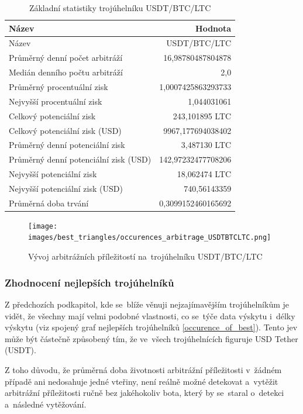 \documentclass[thesis=B,czech]{FITthesis}[2019/03/21]
\begin{document}
\begin{table}\centering
\caption{Základní statistiky trojúhelníku USDT/BTC/LTC}
\label{USDTBTCLTC_stats}
\begin{tabular}{|| l | r ||}
\hline Název & Hodnota \\ 
\hline\hline Název & USDT/BTC/LTC \\ 
\hline Průměrný denní počet arbitráží & 16,98780487804878 \\ 
\hline Medián denního počtu arbitráží & 2,0 \\ 
\hline Průměrný procentuální zisk & 1,0007425863293733 \\ 
\hline Nejvyšší procentuální zisk & 1,044031061 \\ 
\hline Celkový potenciální zisk & 243,101895 LTC \\ 
\hline Celkový potenciální zisk (USD) & 9967,177694038402 \\ 
\hline Průměrný denní potenciální zisk & 3,487130 LTC \\ 
\hline Průměrný denní potenciální zisk (USD) & 142,97232477708206 \\ 
\hline Nejvyšší potenciální zisk & 18,062474 LTC \\ 
\hline Nejvyšší potenciální zisk (USD) & 740,56143359 \\ 
\hline Průměrná doba trvání & 0,3099152460165692 \\ 
\hline
\end{tabular}
\end{table}

\begin{figure}\centering
	\texttt{[image: images/best\_triangles/occurences\_arbitrage\_USDTBTCLTC.png]}
	\caption{Vývoj arbitrážních příležitostí na~trojúhelníku USDT/BTC/LTC }\label{occurences_arbitrage_USDTBTCLTC}
\end{figure}


\subsubsection{Zhodnocení nejlepších trojúhelníků}
Z předchozích podkapitol, kde se~blíže věnuji nejzajímavějším trojúhelníkům je vidět, že všechny mají velmi podobné vlastnosti, co se~týče data výskytu i~délky výskytu (viz spojený graf nejlepších trojúhelníků \ref{occurence_of_best}). Tento jev může být částečně způsobený tím, že ve~všech trojúhelnících figuruje USD Tether (USDT). 

Z toho důvodu, že průměrná doba životnosti arbitrážní příležitosti \linebreak v~žádném případě ani nedosahuje jedné vteřiny, není reálně možné detekovat a~vytěžit arbitrážní příležitosti ručně bez jakéhokoliv bota, který by se~staral o~detekci a~následné vytěžování. 
\end{document}
